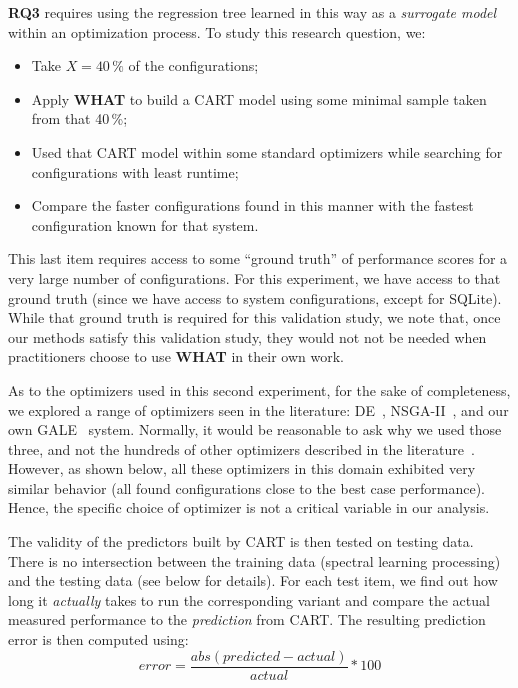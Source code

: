 \documentclass{sig-alternative}
\newcommand{\bi}{\begin{itemize}}%
\newcommand{\ei}{\end{itemize}}
\newcommand{\what}{{\bf WHAT }}
\begin{document}
{\bf RQ3} requires using the regression tree learned in this way as a {\em surrogate model} within an optimization process. To study this research question, we:
\bi
\item Take   $X=40\,\%$ of the configurations;
\item Apply \what to build a CART model using some minimal sample taken from that 40\,\%;
\item Used that CART model within some standard optimizers while searching for 
configurations with least runtime;
\item  Compare the faster configurations found in this manner with the fastest configuration
known for that system.
\ei
This last item requires access to some ``ground truth'' of performance scores for a very
large number of configurations. For this experiment, we have access to that ground truth
(since we have access to system configurations, except for SQLite). While that ground truth is required for this
validation study, we note that, once our methods satisfy this validation study,
they would not not be needed when practitioners choose to use \what in their own work.

As to the optimizers used in this second experiment, for the sake of completeness, we explored
a range of optimizers seen in the   literature:  DE~\cite{storn1997differential}, NSGA-II~\cite{deb00afast},
and our own GALE~\cite{krall2014gale,zuluaga2013active} system.   Normally,
it would be  reasonable to ask
why we used those three, and not the hundreds of other 
optimizers described in the literature~\cite{fletcher13,harman12}. However,
as shown below, all these optimizers in this
domain exhibited  very similar
behavior (all found configurations close to the
best case performance). Hence, the specific
choice of optimizer is not a critical
variable in  our analysis.


The validity of the predictors built by CART is then tested on testing data. There is no intersection between the training data (spectral learning processing) and the testing data (see below for details). 
For each  test item, we find out how long it {\em actually} takes to run the corresponding variant and compare the actual measured performance to the {\em prediction} from CART. The resulting prediction error is then computed using:
\begin{equation}\label{eq:err}
\mathit{error}=\frac{\mathit{abs}(\mathit{predicted} - \mathit{actual})}{\mathit{actual}}*100
\end{equation}
\end{document}
